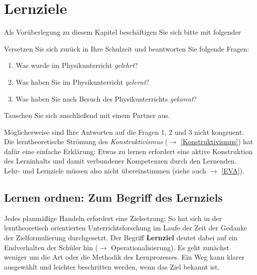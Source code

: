 \chapter{Lernziele}\label{Lernziel}\label{Ziele}


Als Vorüberlegung zu diesem Kapitel beschäftigen Sie sich bitte mit folgender
\begin{uea}
	Versetzen Sie sich zurück in Ihre Schulzeit und beantworten Sie folgende Fragen:
	\begin{enumerate}
		\item Was wurde im Physikunterricht \emph{gelehrt}?
		\item Was haben Sie im Physikunterricht \emph{gelernt}?
		\item Was haben Sie nach Besuch des Physikunterrichts \emph{gekonnt}?
	\end{enumerate}
	Tauschen Sie sich anschließend mit einem Partner aus.	
\end{uea}

Möglicherweise sind Ihre Antworten auf die Fragen 1, 2 und 3 nicht kongruent. Die lerntheoretische Strömung des \emph{Konstruktivismus} ($\to$ \cref{Konstruktivismus}) hat dafür eine einfache Erklärung: Etwas zu lernen erfordert eine aktive Konstruktion des Lerninhalts und damit verbundener Kompetenzen durch den Lernenden. Lehr- und Lernziele müssen also nicht übereinstimmen (siehe auch $\to$ \cref{EVA}).

\section{Lernen ordnen: Zum Begriff des Lernziels}
Jedes planm\"{a}{\ss}ige Handeln erfordert eine Zielsetzung:
So hat sich in der lerntheoretisch orientierten Unterrichtsforschung im Laufe der Zeit der Gedanke
der Zielformulierung durchgesetzt.
\mip
Der Begriff {\bf Lernziel} deutet dabei auf ein Endverhalten
der Sch\"{u}ler hin ($\to$ Operationalisierung). Es geht zun\"{a}chst weniger um die Art oder die Methodik
des Lernprozesses.
\mip
Ein Weg kann klarer ausgew\"{a}hlt und leichter beschritten werden,
wenn das Ziel bekannt ist.

